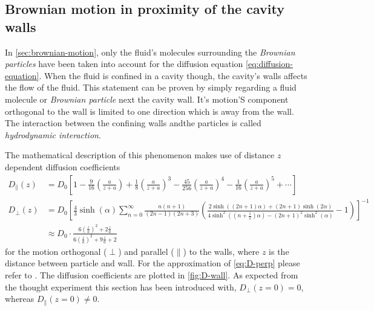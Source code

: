 \documentclass[.../bericht]{subfilies}
\begin{document}
      \subsection{Brownian motion in proximity of the cavity walls}
      \label{subsec:brownian-wall}

        In \cref{sec:brownian-motion}, only the fluid's molecules surrounding the \textit{Brownian particles} have been taken into account for the diffusion equation \cref{eq:diffusion-equation}. When the fluid is confined in a cavity though, the cavity's walls affects the flow of the fluid. This statement can be proven by simply regarding a fluid molecule or \textit{Brownian particle} next the cavity wall. It's motion'S component orthogonal to the wall is limited to one direction which is away from the wall. The interaction between the confining walls andthe particles is called \textit{hydrodynamic interaction}.

        The mathematical description of this phenomenon makes use of distance $z$ dependent diffusion coefficients
        \begin{align}
          D_\parallel(z)&=D_0\left[ 1- \frac{9}{16} \left( \frac{a}{z+a}\right) + \frac{1}{8} \left( \frac{a}{z+a}\right)^3 - \frac{45}{256}\left( \frac{a}{z+a}\right)^4- \frac{1}{16}\left( \frac{a}{z+a}\right)^5+\cdots \right] \label{eq:D-parallel} \\
          D_\perp(z)&=D_0\left[ \frac{4}{3}\sinh (\alpha ) \sum_{n=0}^{\infty} \frac{n(n+1)}{(2n-1)(2n+3)}\left( \frac{2\sinh ((2n+1)\alpha )+(2n+1)\sinh (2\alpha )}{4\sinh^2 ((n+ \frac{1}{2})\alpha)-(2n+1)^2 \sinh^2 (\alpha )} - 1 \right) \right]^{-1} \nonumber \\
          &\approx D_0\cdot \frac{6 \left( \frac{z}{a}\right)^2 + 2 \frac{z}{a}}{6\left( \frac{z}{a}\right)^2 + 9 \frac{z}{a} + 2} \label{eq:D-perp}
        \end{align}
         for the motion orthogonal ($\perp$) and parallel ($\parallel$) to the walls, where $z$ is the distance between particle and wall. For the approximation of \cref{eq:D-perp} please refer to \cite{beavan}. The diffusion coefficients are plotted in \cref{fig:D-wall}. As expected from the thought experiment this section has been introduced with, $D_\perp (z=0)=0$, whereas $D_\parallel (z=0)\ne 0$.
\end{document}
